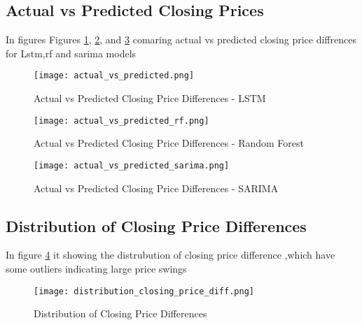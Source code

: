 \subsection{Actual vs Predicted Closing Prices}
In figures Figures \ref{fig:lstm}, \ref{fig:rf}, and \ref{fig:sarima} comaring actual vs predicted closing price diffrences for Lstm,rf and sarima models 
\begin{figure}[H]
    \centering
    \texttt{[image: actual\_vs\_predicted.png]}
    \caption{Actual vs Predicted Closing Price Differences - LSTM}
    \label{fig:lstm}
\end{figure}

\begin{figure}[H]
    \centering
    \texttt{[image: actual\_vs\_predicted\_rf.png]}
    \caption{Actual vs Predicted Closing Price Differences - Random Forest}
    \label{fig:rf}
\end{figure}

\begin{figure}[H]
    \centering
    \texttt{[image: actual\_vs\_predicted\_sarima.png]}
    \caption{Actual vs Predicted Closing Price Differences - SARIMA}
    \label{fig:sarima}
\end{figure}

\subsection{Distribution of Closing Price Differences}
In figure \ref{fig:dist} it showing the distrubution of closing price difference ,which have some outliers indicating large price swings

\begin{figure}[H]
    \centering
    \texttt{[image: distribution\_closing\_price\_diff.png]}
    \caption{Distribution of Closing Price Differences}
    \label{fig:dist}
\end{figure}

